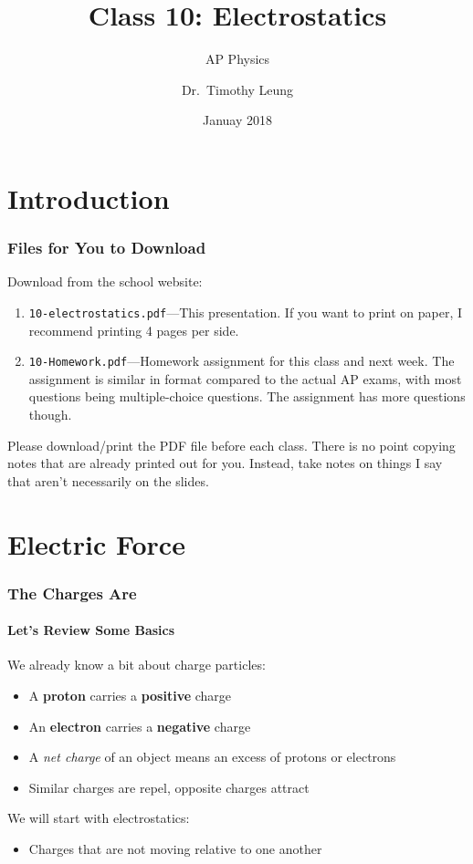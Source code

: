 \documentclass[12pt,aspectratio=169]{beamer}
\title{Class 10: Electrostatics}
\subtitle{AP Physics}
\author[TML]{Dr.\ Timothy Leung}
\institute{Olympiads School}
\date{Januay 2018}
\newcommand{\mb}[1]{\mathbf{#1}}
\begin{document}
\begin{frame}
  \maketitle
\end{frame}


\section[Intro]{Introduction}

\begin{frame}
  \frametitle{Files for You to Download}
  Download from the school website:
  \begin{enumerate}
  \item\texttt{10-electrostatics.pdf}---This presentation. If you want to print
    on paper, I recommend printing 4 pages per side.
  \item\texttt{10-Homework.pdf}---Homework assignment for this class and next
    week.
    The assignment is similar in format compared to the actual AP exams, with
    most questions being multiple-choice questions. The assignment has more
    questions though.
  \end{enumerate}
  
  Please download/print the PDF file before each class. There is no point
  copying notes that are already printed out for you. Instead, take notes on
  things I say that aren't necessarily on the slides.
\end{frame}


\section[$\mb{F}_q$]{Electric Force}

\begin{frame}
  \frametitle{The Charges Are}
  \framesubtitle{Let's Review Some Basics}
  We already know a bit about charge particles:
  \begin{itemize}
  \item A \textbf{proton} carries a \textbf{positive} charge
  \item An \textbf{electron} carries a \textbf{negative} charge
  \item A \emph{net charge} of an object means an excess of protons or electrons
  \item Similar charges are repel, opposite charges attract
  \end{itemize}

  \vspace{0.2in}
  We will start with electrostatics:
  \begin{itemize}
  \item Charges that are not moving relative to one another
  \end{itemize}
\end{frame}
\end{document}
